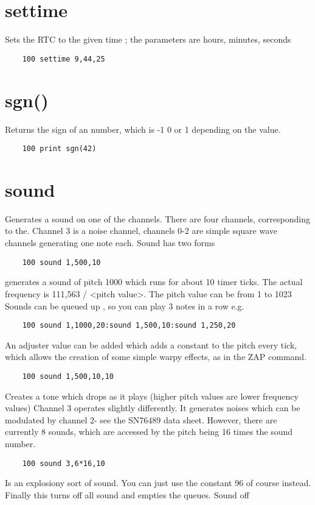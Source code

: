 \section*{settime}
Sets the RTC to the given time ; the parameters are hours, minutes, seconds
\example{}
\begin{verbatim}
	100 settime 9,44,25
\end{verbatim}

\section*{sgn()}
Returns the sign of an number, which is -1 0 or 1 depending on the value.
\example{}
\begin{verbatim}
	100 print sgn(42)
\end{verbatim}

\section*{sound}
Generates a sound on one of the channels. There are four channels, corresponding to the. Channel 3 is a noise channel, channels 0-2 are simple square wave channels generating one note each. 
Sound has two forms
\example{}
\begin{verbatim}
	100 sound 1,500,10
\end{verbatim}
generates a sound of pitch 1000 which runs for about 10 timer ticks. The actual frequency is 111,563 / <pitch value>. The pitch value can be from 1 to 1023
Sounds can be queued up , so you can play 3 notes in a row e.g.
\example{}
\begin{verbatim}
	100 sound 1,1000,20:sound 1,500,10:sound 1,250,20
\end{verbatim}
An adjuster value can be added which adds a constant to the pitch every tick, which allows the creation of some simple warpy effects, as in the ZAP command.
\example{}
\begin{verbatim}
	100 sound 1,500,10,10
\end{verbatim}
Creates a tone which drops as it plays (higher pitch values are lower frequency values)
Channel 3 operates slightly differently. It generates noises which can be modulated by channel 2- see the SN76489 data sheet.
However, there are currently 8 sounds, which are accessed by the pitch being 16 times the sound number.
\example{}
\begin{verbatim}
	100 sound 3,6*16,10
\end{verbatim}
Is an explosiony sort of sound. You can just use the constant 96 of course instead.
Finally this turns off all sound and empties the queues.
Sound off

